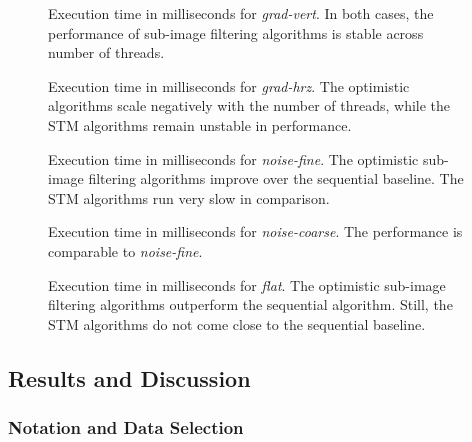 \begin{figure}
  \centering
  \caption[Execution time in milliseconds for \emph{grad-vert}.]{Execution time in
    milliseconds for \emph{grad-vert}. In both cases, the performance of sub-image
    filtering algorithms is stable across number of threads.}
  \label{fig:hypothesis-1-a}

  \caption[Execution time in milliseconds for \emph{grad-hrz}.]{Execution time
    in milliseconds for \emph{grad-hrz}. The optimistic algorithms scale
    negatively with the number of threads, while the STM algorithms remain
    unstable in performance.}
  \label{fig:hypothesis-1-b}

  \caption[Execution time in milliseconds for \emph{noise-fine}.]{Execution time
    in milliseconds for \emph{noise-fine}. The optimistic sub-image filtering
    algorithms improve over the sequential baseline. The STM algorithms run very
    slow in comparison.}
  \label{fig:hypothesis-2-a}
\end{figure}

\begin{figure}[t]
  \centering
  \caption[Execution time in milliseconds for \emph{noise-coarse}.]{Execution
    time in milliseconds for \emph{noise-coarse}. The performance is comparable
    to \emph{noise-fine}.}
  \label{fig:hypothesis-2-b}

  \caption[Execution time in milliseconds for \emph{flat}.]{Execution time in
    milliseconds for \emph{flat}. The optimistic sub-image filtering algorithms
    outperform the sequential algorithm. Still, the STM algorithms do not come
    close to the sequential baseline.}
  \label{fig:hypothesis-3}
\end{figure}

\subsection{Results and Discussion}
\label{sec:experiments-ao-results}

\subsubsection{Notation and Data Selection}

